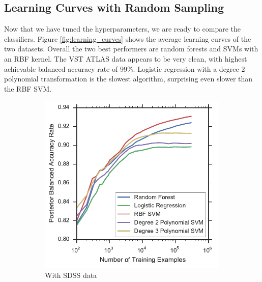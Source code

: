 \subsection{Learning Curves with Random Sampling}
Now that we have tuned the hyperparameters, we are ready to compare the classifiers.
Figure \ref{fig:learning_curves} shows the average learning curves of the two datasets.
Overall the two best performers are random forests and SVMs with an RBF kernel. The VST ATLAS
data appears to be very clean, with highest achievable balanced accuracy rate of 99\%.
Logistic regression with a degree 2 polynomial transformation is the slowest algorithm,
surprising even slower than the RBF SVM.

\begin{figure}[tbp]
	\centering
	\begin{subfigure}{.5\textwidth}
		\centering
		\includegraphics[width=0.99\textwidth]{figures/4_expt1/sdss_learning_curves}
		\caption{With SDSS data}
		\label{fig:sdss_learning_curves}
	\end{subfigure}%
	\begin{subfigure}{.5\textwidth}
		\centering

\end{subfigure}
\end{figure}
